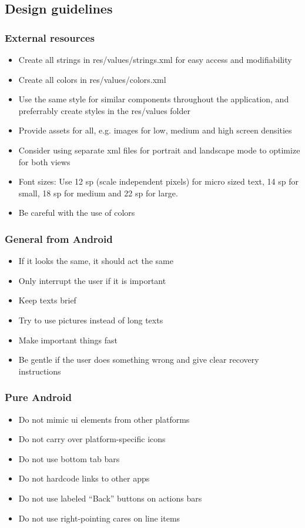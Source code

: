 \subsection{Design guidelines}

\subsubsection{External resources}
\begin{itemize}
\item{}Create all strings in res/values/strings.xml for easy access and modifiability
\item{}Create all colors in res/values/colors.xml 
\item{}Use the same style for similar components throughout the application, and preferrably create styles in the res/values folder
\item{}Provide assets for all, e.g. images for low, medium and high screen densities
\item{}Consider using separate \gls{xml} files for portrait and landscape mode to optimize for both views
\item{}Font sizes: Use 12 \gls{sp} (scale independent pixels) for micro sized text, 14 \gls{sp} for small, 18 \gls{sp} for medium and 22 \gls{sp} for large. 
\item{}Be careful with the use of colors
\end{itemize}

\subsubsection{General from Android \cite{bib:android}}
\begin{itemize}
\item{}If it looks the same, it should act the same
\item{}Only interrupt the user if it is important
\item{}Keep texts brief 
\item{}Try to use pictures instead of long texts
\item{}Make important things fast
\item{}Be gentle if the user does something wrong and give clear recovery instructions
\end{itemize}

\subsubsection{Pure Android \cite{bib:pandroid}}
\begin{itemize}
\item{}Do not mimic \gls{ui} elements from other platforms
\item{}Do not carry over platform-specific icons
\item{}Do not use bottom tab bars
\item{}Do not hardcode links to other apps
\item{}Do not use labeled “Back” buttons on actions bars
\item{}Do not use right-pointing cares on line items 
\end{itemize}